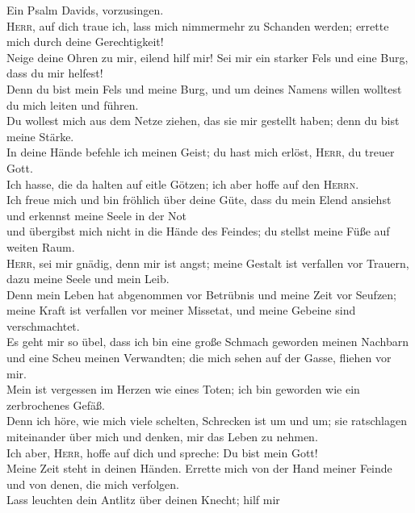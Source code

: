  Ein Psalm Davids, vorzusingen.\\
 \textsc{Herr}, auf dich traue ich, lass mich nimmermehr
zu Schanden werden; errette mich durch deine Gerechtigkeit!\\
 Neige deine Ohren zu mir, eilend hilf mir! Sei mir ein
starker Fels und eine Burg, dass du mir helfest!\\
 Denn du bist mein Fels und meine Burg, und um deines
Namens willen wolltest du mich leiten und führen.\\
 Du wollest mich aus dem Netze ziehen, das sie mir
gestellt haben; denn du bist meine Stärke.\\
 In deine Hände befehle ich meinen Geist; du hast mich
erlöst, \textsc{Herr}, du treuer Gott.\\
 Ich hasse, die da halten auf eitle Götzen; ich aber hoffe
auf den \textsc{Herrn}.\\
 Ich freue mich und bin fröhlich über deine Güte, dass du
mein Elend ansiehst und erkennst meine Seele in der Not\\
 und übergibst mich nicht in die Hände des Feindes; du
stellst meine Füße auf weiten Raum.\\
 \textsc{Herr}, sei mir gnädig, denn mir ist angst; meine
Gestalt ist verfallen vor Trauern, dazu meine Seele und mein Leib.\\
 Denn mein Leben hat abgenommen vor Betrübnis und meine
Zeit vor Seufzen; meine Kraft ist verfallen vor meiner Missetat, und
meine Gebeine sind verschmachtet.\\
 Es geht mir so übel, dass ich bin eine große Schmach
geworden meinen Nachbarn und eine Scheu meinen Verwandten; die mich
sehen auf der Gasse, fliehen vor mir.\\
 Mein ist vergessen im Herzen wie eines Toten; ich bin
geworden wie ein zerbrochenes Gefäß.\\
 Denn ich höre, wie mich viele schelten, Schrecken ist um
und um; sie ratschlagen miteinander über mich und denken, mir das Leben
zu nehmen.\\
 Ich aber, \textsc{Herr}, hoffe auf dich und spreche: Du
bist mein Gott!\\
 Meine Zeit steht in deinen Händen. Errette mich von der
Hand meiner Feinde und von denen, die mich verfolgen.\\
 Lass leuchten dein Antlitz über deinen Knecht; hilf mir
